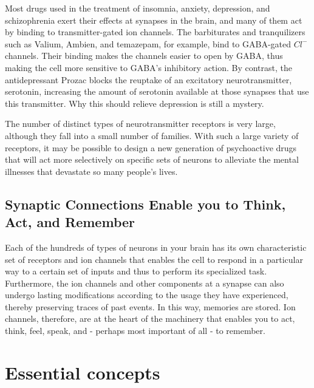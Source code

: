 Most drugs used in the treatment of insomnia, anxiety, depression, and
schizophrenia exert their effects at synapses in the brain, and many of
them act by binding to transmitter-gated ion channels. The barbiturates
and tranquilizers such as Valium, Ambien, and temazepam, for example,
bind to GABA-gated $Cl^{-}$ channels. Their binding makes the channels easier
to open by GABA, thus making the cell more sensitive to GABA’s inhibitory
action. By contrast, the antidepressant Prozac blocks the reuptake
of an excitatory neurotransmitter, serotonin, increasing the amount of
serotonin available at those synapses that use this transmitter. Why this
should relieve depression is still a mystery.

The number of distinct types of neurotransmitter receptors is very large,
although they fall into a small number of families. With such a large variety of receptors, it
may be possible to design a new generation of psychoactive drugs that
will act more selectively on specific sets of neurons to alleviate the mental
illnesses that devastate so many people’s lives.

\subsection{Synaptic Connections Enable you to Think, Act, and Remember}

Each of the hundreds of types of neurons in your brain has its own characteristic set
of receptors and ion channels that enables the cell to respond in a particular
way to a certain set of inputs and thus to perform its specialized
task. Furthermore, the ion channels and other components at a synapse
can also undergo lasting modifications according to the usage they have
experienced, thereby preserving traces of past events. In this way, memories
are stored. Ion channels, therefore, are at the heart of the machinery
that enables you to act, think, feel, speak, and - perhaps most important
of all - to remember.

\section{Essential concepts}

